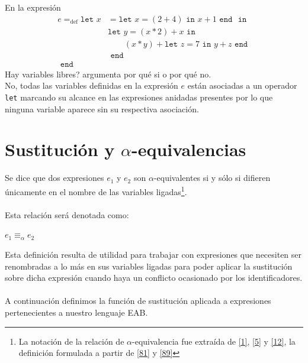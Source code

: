     \begin{exercise}
        En la expresión
	 \begin{align*}
    	e=_{\text{def}}\texttt{let  }
    		x&= \texttt{let }x = (2 + 4) \texttt{ in } x+1 \texttt{ end }
    		\texttt{ in }\\
    		 &\texttt{let }y=(x \ast 2)+x 
    		 	\texttt{ in } \\
    		 & \qquad(x\ast y) + \texttt{let }z=7 \texttt{ in } 
    		 						y+z 
    		 				\texttt{ end }\\
    		 &\texttt{ end }\\
    	\texttt{ end }&
    \end{align*}
 	Hay variables libres? argumenta por qué si o por qué no. \\
    
        No, todas las variables definidas en la expresión $e$ están asociadas a un operador \texttt{let} marcando su alcance en las expresiones anidadas presentes por lo que ninguna variable aparece sin su respectiva asociación.
    \end{exercise}

\section{Sustitución y $\alpha$-equivalencias}
    \begin{definition} Se dice que dos expresiones $e_1$ y $e_2$ son $\alpha$-equivalentes si y sólo si difieren únicamente en el nombre de las variables ligadas\footnote{La notación de la relación de $\alpha$-equivalencia fue extraída de \hyperlink{1}{[1]}, \hyperlink{5}{[5]} y \hyperlink{12}{[12]}, la definición formulada a partir de \hyperlink{81}{[81]} y \hyperlink{89}{[89]}}.\\\\
    Esta relación será denotada como: 
    \begin{center}
            $e_1\equiv_\alpha e_2$        
    \end{center}
    \end{definition}

    Esta definición resulta de utilidad para trabajar con expresiones que necesiten ser renombradas a lo más en sus variables ligadas para poder aplicar la sustitución sobre dicha expresión cuando haya un conflicto ocasionado por los identificadores. \\\\
    A continuación definimos la función de sustitución aplicada a expresiones pertenecientes a nuestro lenguaje \textsf{EAB}.


